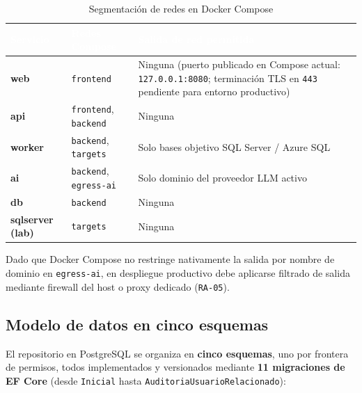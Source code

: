 \documentclass[12pt,a4paper]{article}
\begin{document}
\begingroup
{}
\begin{table}[H]
\centering
\small
\begin{tabularx}{\textwidth}{>{\bfseries}p{} p{} X}
\toprule
\rowcolor{utbblue}
\textcolor{white}{\textbf{Servicio}} & \textcolor{white}{\textbf{Redes Compose}} & \textcolor{white}{\textbf{Salida de red permitida}} \\
\midrule
web & \texttt{frontend} & Ninguna (puerto publicado en Compose actual: \texttt{127.0.0.1:8080}; terminación TLS en \texttt{443} pendiente para entorno productivo) \\
api & \texttt{frontend}, \texttt{backend} & Ninguna \\
worker & \texttt{backend}, \texttt{targets} & Solo bases objetivo SQL Server / Azure SQL \\
ai & \texttt{backend}, \texttt{egress-ai} & Solo dominio del proveedor LLM activo \\
db & \texttt{backend} & Ninguna \\
sqlserver (lab) & \texttt{targets} & Ninguna \\
\bottomrule
\end{tabularx}
\caption{Segmentación de redes en Docker Compose}
\label{tab:redes}
\end{table}
\endgroup

Dado que Docker Compose no restringe nativamente la salida por nombre de dominio en \texttt{egress-ai}, en despliegue productivo debe aplicarse filtrado de salida mediante firewall del host o proxy dedicado (\texttt{RA-05}).

\subsection{Modelo de datos en cinco esquemas}

El repositorio en PostgreSQL se organiza en \textbf{cinco esquemas}, uno por frontera de permisos, todos implementados y versionados mediante \textbf{11 migraciones de EF Core} (desde \texttt{Inicial} hasta \texttt{AuditoriaUsuarioRelacionado}):
\end{document}
